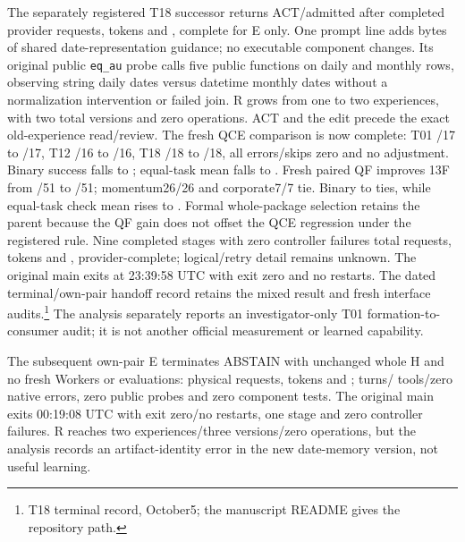 The separately registered T18 successor returns ACT/admitted after
\TEighteenDateKeyERequests{} completed provider requests,
\TEighteenDateKeyETokens{} tokens and \TEighteenDateKeyECost{}, complete for E
only. One prompt line adds \TEighteenDateKeyPromptAddedBytes{} bytes of shared
date-representation guidance; no executable component changes. Its original public
\texttt{eq\_au} probe calls five public functions on
\TEighteenDateKeyDailyRows{} daily and \TEighteenDateKeyMonthlyRows{} monthly
rows, observing string daily dates versus datetime monthly dates without a
normalization intervention or failed join. R grows from one to two experiences,
with two total versions and zero operations. ACT and the edit precede the exact
old-experience read/review. The fresh QCE comparison is now complete: T01
\TEighteenDateKeyIncumbentTOnePassed{}/17 to \TEighteenDateKeyCandidateTOnePassed{}/17,
T12 \TEighteenDateKeyIncumbentTTwelvePassed{}/16 to \TEighteenDateKeyCandidateTTwelvePassed{}/16,
T18 \TEighteenDateKeyIncumbentTEighteenPassed{}/18 to \TEighteenDateKeyCandidateTEighteenPassed{}/18,
all errors/skips zero and no adjustment. Binary success falls
\TEighteenDateKeyIncumbentQCEBinary{} to \TEighteenDateKeyCandidateQCEBinary{};
equal-task mean falls \TEighteenDateKeyIncumbentQCEMean{} to
\TEighteenDateKeyCandidateQCEMean{}. Fresh paired QF improves 13F from
\TEighteenDateKeyIncumbentThirteenFPassed{}/51 to
\TEighteenDateKeyCandidateThirteenFPassed{}/51; momentum26/26 and corporate7/7 tie.
Binary \TEighteenDateKeyIncumbentQFBinary{} to \TEighteenDateKeyCandidateQFBinary{}
ties, while equal-task check mean rises \TEighteenDateKeyIncumbentQFMean{} to
\TEighteenDateKeyCandidateQFMean{}. Formal whole-package selection retains the
parent because the QF gain does not offset the QCE regression under the
registered rule. Nine completed stages with zero controller failures total
\TEighteenDateKeyReturnedRequests{} requests, \TEighteenDateKeyReturnedTokens{}
tokens and \TEighteenDateKeyReturnedCost{}, provider-complete;
logical/retry detail remains unknown. The original main exits at 23:39:58 UTC
with exit zero and no restarts. The dated terminal/own-pair handoff record
retains the mixed result and fresh interface audits.\footnote{T18 terminal
record, October5; the manuscript README gives the repository path.}
The analysis separately reports an investigator-only T01 formation-to-consumer
audit; it is not another official measurement or learned capability.

The subsequent own-pair E terminates ABSTAIN with unchanged whole H and no
fresh Workers or evaluations: \OwnPairTerminalRequests{} physical requests,
\OwnPairTerminalTokens{} tokens and \OwnPairTerminalCost{};
\OwnPairTerminalTurns{} turns/\OwnPairTerminalToolCalls{} tools/zero native
errors, zero public probes and zero component tests. The original main exits
00:19:08 UTC with exit zero/no restarts, one stage and zero controller failures.
R reaches two experiences/three versions/zero operations, but the analysis
records an artifact-identity error in the new date-memory version, not useful learning.

